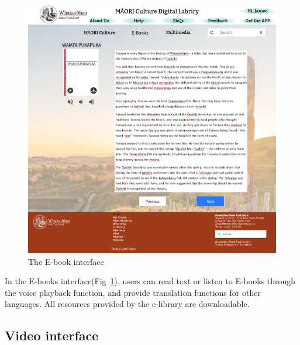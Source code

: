 \begin{figure}[htbp]
  \centerline{\includegraphics[width=400pt]{images/3-2-2.png}}
  \caption{The E-book interface}
  \label{fig34}
\end{figure}

In the E-books interface(Fig~\ref{fig34}), users can read text or listen to E-books through the voice playback function, and provide translation functions for other languages. All resources provided by the e-library are downloadable.

\subsection{Video interface}

